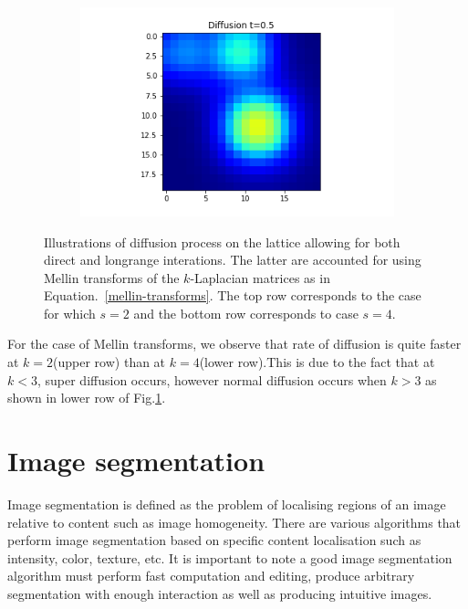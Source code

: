 \documentclass[10pt,a4paper]{article}
\begin{document}
\begin{enumerate}[i)]
\begin{enumerate}[a)]
\begin{figure}[!h]
\begin{subfigure}[b]{0.25\textwidth}
         	    	\end{subfigure}~
         	    	\begin{subfigure}[b]{0.25\textwidth}
         	    		\includegraphics[width= \textwidth]{images/mellin-x4-t5.png}
         	    	\end{subfigure}
         	    	\caption{Illustrations of diffusion process on the lattice allowing for both direct and longrange interations. The latter are accounted for using Mellin transforms of the $k$-Laplacian matrices as in Equation.~\ref{mellin-transforms}. The top row corresponds to the case for which $s=2$ and the bottom row corresponds to case $s=4$.}
         	    	\label{mellintransformsfig}
         	    \end{figure}
         	 For the case of Mellin transforms, we observe that rate of diffusion is quite faster at $k=2$(upper row) than at $k=4$(lower row).This is due to the fact that at $k<3$, super diffusion occurs, however normal diffusion occurs when $k>3$ as shown in lower row of Fig.\ref{mellintransformsfig}.
         	\end{enumerate}
         \end{enumerate}
         
  
\newpage
\section{Image segmentation}
Image segmentation is defined as the problem of localising regions of an image relative to content such as image homogeneity. There are various algorithms that perform image segmentation based on specific content localisation such as intensity, color, texture, etc.
It is important to note a good image segmentation algorithm must perform fast computation and editing, produce arbitrary segmentation with enough interaction as well as producing intuitive images. 
\end{document}
